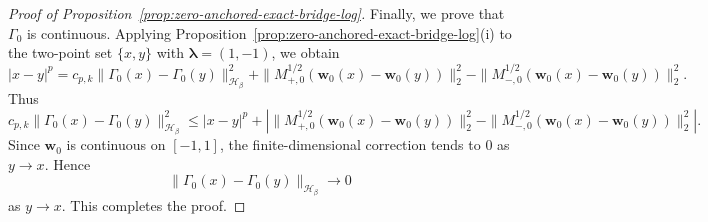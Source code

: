 \documentclass[10pt,a4paper]{amsart}
\begin{document}
\begin{proof}[Proof of Proposition~\ref{prop:zero-anchored-exact-bridge-log}]
Finally, we prove that \(\Gamma_0\) is continuous.  Applying
Proposition~\ref{prop:zero-anchored-exact-bridge-log}\textnormal{(i)} to the
two-point set \(\{x,y\}\) with \(\boldsymbol\lambda=(1,-1)\), we obtain
\[
|x-y|^p
=
c_{p,k}\|\Gamma_0(x)-\Gamma_0(y)\|_{\mathcal H_\beta}^2
+
\|M_{+,0}^{1/2}(\boldsymbol w_0(x)-\boldsymbol w_0(y))\|_2^2
-
\|M_{-,0}^{1/2}(\boldsymbol w_0(x)-\boldsymbol w_0(y))\|_2^2.
\]
Thus
\[
c_{p,k}\|\Gamma_0(x)-\Gamma_0(y)\|_{\mathcal H_\beta}^2
\le
|x-y|^p
+
\left|
\|M_{+,0}^{1/2}(\boldsymbol w_0(x)-\boldsymbol w_0(y))\|_2^2
-
\|M_{-,0}^{1/2}(\boldsymbol w_0(x)-\boldsymbol w_0(y))\|_2^2
\right|.
\]
Since \(\boldsymbol w_0\) is continuous on \([-1,1]\), the finite-dimensional correction tends
to \(0\) as \(y\to x\).  Hence
\[
\|\Gamma_0(x)-\Gamma_0(y)\|_{\mathcal H_\beta}\to0
\]
as \(y\to x\).  This completes the proof.



\end{proof}
\end{document}
